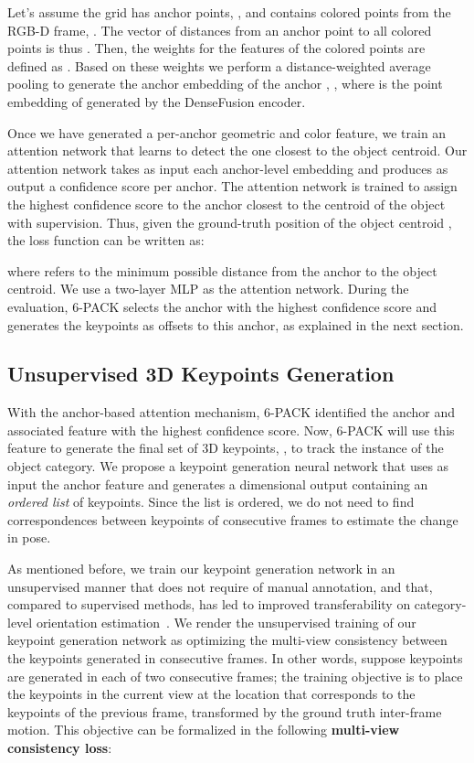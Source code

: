 \documentclass[letterpaper, 10 pt, conference]{ieeeconf}
\newcommand{\methodname}{\textsc{6-PACK}\xspace}
\begin{document}
Let's assume the grid has  anchor points, , and contains  colored points from the RGB-D frame, . The vector of distances from an anchor point to all colored points is thus . Then, the weights for the features of the colored points are defined as . Based on these weights we perform a distance-weighted average pooling to generate the anchor embedding  of the anchor , 
, where  is the point embedding of  generated by the DenseFusion encoder. 

Once we have generated a per-anchor geometric and color feature, we train an attention network that learns to detect the one closest to the object centroid. Our attention network takes as input each anchor-level embedding  and produces as output a confidence score  per anchor. The attention network is trained to assign the highest confidence score to the anchor closest to the centroid of the object with supervision. Thus, given the ground-truth position of the object centroid , the loss function can be written as:


where  refers to the minimum possible distance from the anchor to the object centroid. We use a two-layer MLP as the attention network. During the evaluation, \methodname{} selects the anchor with the highest confidence score and generates the keypoints as offsets to this anchor, as explained in the next section. 

\subsection{Unsupervised 3D Keypoints Generation}
\label{ss:ukg}

With the anchor-based attention mechanism, \methodname{} identified the anchor  and associated feature  with the highest confidence score. Now, \methodname{} will use this feature to generate the final set of 3D keypoints, , to track the instance of the object category. We propose a keypoint generation neural network that uses as input the anchor feature and generates a  dimensional output containing an \emph{ordered list} of keypoints. Since the list is ordered, we do not need to find correspondences between keypoints of consecutive frames to estimate the change in pose.

As mentioned before, we train our keypoint generation network in an unsupervised manner that does not require of manual annotation, and that, compared to supervised methods, has led to improved transferability on category-level orientation estimation~\cite{suwajanakorn2018discovery}. We render the unsupervised training of our keypoint generation network as optimizing the multi-view consistency between the keypoints generated in consecutive frames. In other words, suppose  keypoints are generated in each of two consecutive frames; the training objective is to place the keypoints in the current view at the location that corresponds to the keypoints of the previous frame, transformed by the ground truth inter-frame motion. This objective can be formalized in the following \textbf{multi-view consistency loss}:
\end{document}
